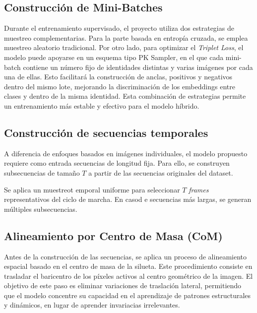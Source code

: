 \subsection{Construcción de Mini-Batches}

Durante el entrenamiento supervisado, el proyecto utiliza dos estrategias de muestreo complementarias. Para la parte basada en entropía cruzada, se emplea muestreo aleatorio tradicional. Por otro lado, para optimizar el \textit{Triplet Loss}, el modelo puede apoyarse en un esquema tipo PK Sampler, en el que cada mini-batch contiene un número fijo de identidades distintas y varias imágenes por cada una de ellas. Esto facilitará la construcción de anclas, positivos y negativos dentro del mismo lote, mejorando la discriminación de los embeddings entre clases y dentro de la misma identidad. Esta combinación de estrategias permite un entrenamiento más estable y efectivo para el modelo híbrido.

\subsection{Construcción de secuencias temporales}

A diferencia de enfoques basados en imágenes individuales, el modelo propuesto requiere como entrada secuencias de longitud fija. Para ello, se construyen subsecuencias de tamaño $T$ a partir de las secuencias originales del dataset. 

Se aplica un muestreot emporal uniforme para seleccionar $T$ \textit{frames} representativos del ciclo de marcha. En casod e secuencias más largas, se generan múltiples subsecuencias.

\subsection{Alineamiento por Centro de Masa (CoM)}

Antes de la construcción de las secuencias, se aplica un proceso de alineamiento espacial basado en el centro de masa de la silueta. Este procedimiento consiste en trasladar el baricentro de los píxeles activos al centro geométrico de la imagen. El objetivo de este paso es eliminar variaciones de traslación lateral, permitiendo que el modelo concentre su capacidad en el aprendizaje de patrones estructurales y dinámicos, en lugar de aprender invariacias irrelevantes.

